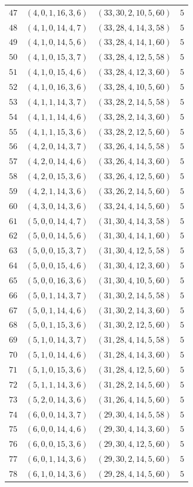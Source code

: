 \documentclass[11pt]{article}
\begin{document}
\begin{longtable}{rccr}
$47$ & $(4,0,1,16,3,6)$ & $(33,30,2,10,5,60)$ & $5$\\
$48$ & $(4,1,0,14,4,7)$ & $(33,28,4,14,3,58)$ & $5$\\
$49$ & $(4,1,0,14,5,6)$ & $(33,28,4,14,1,60)$ & $5$\\
$50$ & $(4,1,0,15,3,7)$ & $(33,28,4,12,5,58)$ & $5$\\
$51$ & $(4,1,0,15,4,6)$ & $(33,28,4,12,3,60)$ & $5$\\
$52$ & $(4,1,0,16,3,6)$ & $(33,28,4,10,5,60)$ & $5$\\
$53$ & $(4,1,1,14,3,7)$ & $(33,28,2,14,5,58)$ & $5$\\
$54$ & $(4,1,1,14,4,6)$ & $(33,28,2,14,3,60)$ & $5$\\
$55$ & $(4,1,1,15,3,6)$ & $(33,28,2,12,5,60)$ & $5$\\
$56$ & $(4,2,0,14,3,7)$ & $(33,26,4,14,5,58)$ & $5$\\
$57$ & $(4,2,0,14,4,6)$ & $(33,26,4,14,3,60)$ & $5$\\
$58$ & $(4,2,0,15,3,6)$ & $(33,26,4,12,5,60)$ & $5$\\
$59$ & $(4,2,1,14,3,6)$ & $(33,26,2,14,5,60)$ & $5$\\
$60$ & $(4,3,0,14,3,6)$ & $(33,24,4,14,5,60)$ & $5$\\
$61$ & $(5,0,0,14,4,7)$ & $(31,30,4,14,3,58)$ & $5$\\
$62$ & $(5,0,0,14,5,6)$ & $(31,30,4,14,1,60)$ & $5$\\
$63$ & $(5,0,0,15,3,7)$ & $(31,30,4,12,5,58)$ & $5$\\
$64$ & $(5,0,0,15,4,6)$ & $(31,30,4,12,3,60)$ & $5$\\
$65$ & $(5,0,0,16,3,6)$ & $(31,30,4,10,5,60)$ & $5$\\
$66$ & $(5,0,1,14,3,7)$ & $(31,30,2,14,5,58)$ & $5$\\
$67$ & $(5,0,1,14,4,6)$ & $(31,30,2,14,3,60)$ & $5$\\
$68$ & $(5,0,1,15,3,6)$ & $(31,30,2,12,5,60)$ & $5$\\
$69$ & $(5,1,0,14,3,7)$ & $(31,28,4,14,5,58)$ & $5$\\
$70$ & $(5,1,0,14,4,6)$ & $(31,28,4,14,3,60)$ & $5$\\
$71$ & $(5,1,0,15,3,6)$ & $(31,28,4,12,5,60)$ & $5$\\
$72$ & $(5,1,1,14,3,6)$ & $(31,28,2,14,5,60)$ & $5$\\
$73$ & $(5,2,0,14,3,6)$ & $(31,26,4,14,5,60)$ & $5$\\
$74$ & $(6,0,0,14,3,7)$ & $(29,30,4,14,5,58)$ & $5$\\
$75$ & $(6,0,0,14,4,6)$ & $(29,30,4,14,3,60)$ & $5$\\
$76$ & $(6,0,0,15,3,6)$ & $(29,30,4,12,5,60)$ & $5$\\
$77$ & $(6,0,1,14,3,6)$ & $(29,30,2,14,5,60)$ & $5$\\
$78$ & $(6,1,0,14,3,6)$ & $(29,28,4,14,5,60)$ & $5$\\
\bottomrule
\end{longtable}
\end{document}
